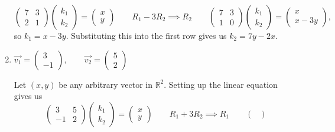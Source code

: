 \documentclass{article}
\begin{document}
\begin{enumerate}
\begin{solution}
\[            \begin{pmatrix}
                7&3\\2&1
            \end{pmatrix} \begin{pmatrix}
                k_1\\k_2
            \end{pmatrix} = \begin{pmatrix}
                x\\y
            \end{pmatrix} \qquad R_1 - 3R_2 \implies R_2 \qquad \begin{pmatrix}
                7&3 \\ 1&0 
            \end{pmatrix} \begin{pmatrix}
                k_1\\k_2
            \end{pmatrix} = \begin{pmatrix}
                x \\x-3y
            \end{pmatrix},
        \] so \(k_1 = x-3y\). Substituting this into the first row gives us \(k_2 = 7y - 2x\).
    \end{solution}
    \item \(\overrightarrow{v_1} = \begin{pmatrix}
        3\\-1
    \end{pmatrix},\qquad\overrightarrow{v_2} = \begin{pmatrix}
        5\\2
    \end{pmatrix}\)\begin{solution}
        Let \((x,y)\) be any arbitrary vector in \(\mathbb{R}^2\). Setting up the linear equation gives us\[
            \begin{pmatrix}
                3&5\\-1&2
            \end{pmatrix} \begin{pmatrix}
                k_1\\k_2
            \end{pmatrix} = \begin{pmatrix}
                x\\y
            \end{pmatrix} \qquad R_1 + 3R_2 \implies R_1 \qquad \begin{pmatrix}

\end{pmatrix}\]
\end{solution}
\end{enumerate}
\end{document}

